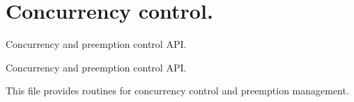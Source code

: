 \hypertarget{group__cc}{}\section{Concurrency control.}
\label{group__cc}


Concurrency and preemption control A\+PI.  


Concurrency and preemption control A\+PI. 

This file provides routines for concurrency control and preemption management. 